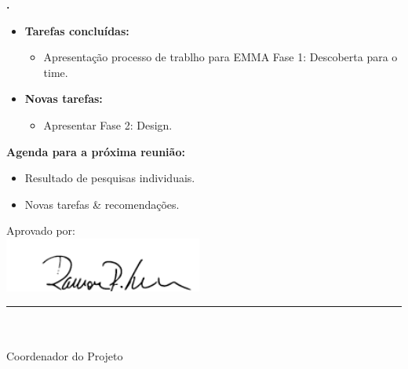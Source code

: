 			
   \textbf{\julia.} 
	\begin{itemize}
		\item \textbf{Tarefas concluídas:}
			\begin{itemize}    
				\item Apresentação processo de trablho para EMMA Fase 1: Descoberta para o
				time.
			\end{itemize}
		
		\item \textbf{Novas tarefas:}
			\begin{itemize} 

			    \item Apresentar Fase 2: Design.
			\end{itemize}
	\end{itemize}		



\textbf{Agenda para a próxima reunião:}
  \begin{itemize}
    \item Resultado de pesquisas individuais.
    \item Novas tarefas \& recomendações.
  \end{itemize}


\vspace{5mm}%
\parbox[t]{70mm}{
  Aprovado por: \\[5mm]
  \centering
  \includegraphics[width=65mm]{figs/logo/assinatura-ramon.png} \\[-4mm]
  \rule[2mm]{70mm}{0.1mm} \\
  \ramon \\[1mm]
  Coordenador do Projeto \\
}

\fim